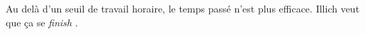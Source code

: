 %
    {Au delà d’un seuil de travail horaire, le temps passé n’est plus efficace.}%
    {Illich veut que ça se \emph{\og finish \fg}.}
